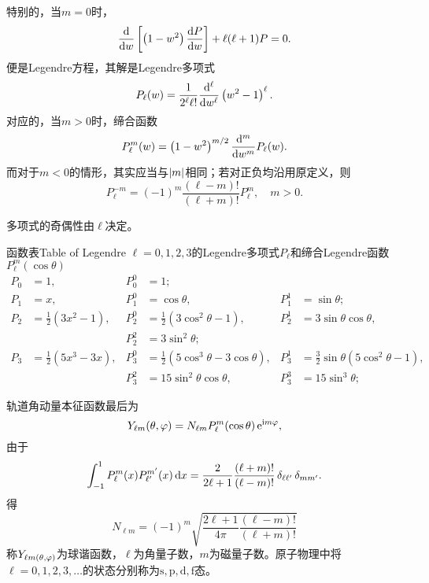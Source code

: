 特别的，当$m=0$时，
\[
	\dd w\fkh{\kh{1-w^2}\dv Pw}+\ell(\ell+1)P=0.
\]
便是Legendre方程，其解是Legendre多项式
\[
P_\ell(w)=\frac1{2^\ell\ell!}\dd[\ell]w\kh{w^2-1}^\ell.
\]
对应的，当$m>0$时，缔合\Legd 函数
\[
P_\ell^m(w)=\kh{1-w^2}^{m/2}\dd[m]wP_\ell(w).
\]
而对于$m<0$的情形，其实应当与$\abs m$相同；若对正负均沿用原定义，则
\[
P_\ell^{-m}=(-1)^m\frac{(\ell-m)!}{(\ell+m)!}P_\ell^m,\quad m>0.
\]

\Legd 多项式的奇偶性由$\ell$决定。
\begin{example}{\Legd 函数表}{Table of Legendre}
	$\ell=0,1,2,3$的Legendre多项式$P_\ell$和缔合Legendre函数$P_\ell^m(\cos\theta)$%
	\small{\begin{align*}
			P_0 & =1, & P_0^0 & =1;\\
			P_1 & =x, & P_1^0 & =\cos\theta, & P_1^1 & =\sin\theta;\\
			P_2 & =\frac12(3x^2-1), & P_2^0 & =\frac12(3\cos^2\theta-1), & P_2^1 & =3\sin\theta\cos\theta,\\
			    && P_2^2 &=3\sin^2\theta;\\
			P_3 & =\frac12(5x^3-3x), & P_3^0 & =\frac12(5\cos^3\theta-3\cos\theta), & P_3^1 & =\frac32\sin\theta(5\cos^2\theta-1),\\
			    && P_3^2 & =15\sin^2\theta\cos\theta, & P_3^3 & =15\sin^3\theta;
		\end{align*}}
\end{example}
轨道角动量本征函数最后为
\[
	Y_{\ell m}(\ct,\vf)=N_{\ell m}P_\ell^m(\cos\ct)\e{\i m\vf},
\]
由于
\[
	\int_{-1}^1P_\ell^m(x)P_{\ell'}^{m'}(x)\d x=\frac2{2\ell+1}\frac{(\ell+m)!}{(\ell-m)!}\vd_{\ell\ell'}\vd_{mm'}.
\]
得
\[
N_{\ell m}=(-1)^m\sqrt{\frac{2\ell+1}{4\pi}\frac{(\ell-m)!}{(\ell+m)!}}
\]
称$Y_{\ell m(\ct,\vf)}$为球谐函数，$\ell$为角量子数，$m$为磁量子数。原子物理中将$\ell=0,1,2,3,\ldots$的状态分别称为$\mathrm{s,p,d,f}$态。

